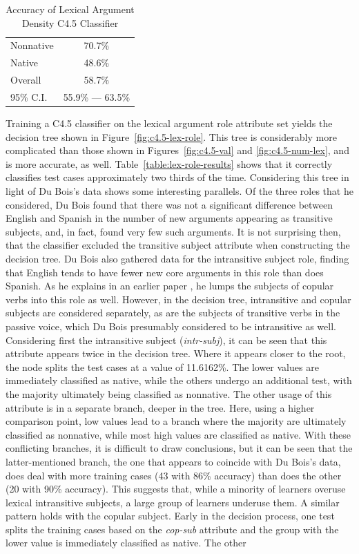 \documentclass[main.tex]{subfiles}
\begin{document}
\begin{table}[ht]
\centering
\caption{Accuracy of Lexical Argument Density C4.5 Classifier}
\begin{tabular}{l c}
\toprule
Nonnative & 70.7\% \\
Native & 48.6\% \\
Overall & 58.7\% \\
95\% C.I. & 55.9\% --- 63.5\%\\
\bottomrule
\end{tabular}
\label{table:num-lex-results}
\end{table}

Training a C4.5 classifier on the lexical argument role attribute set yields the decision tree shown in Figure~\ref{fig:c4.5-lex-role}. This tree is considerably more complicated than those shown in Figures~\ref{fig:c4.5-val} and \ref{fig:c4.5-num-lex}, and is more accurate, as well. Table~\ref{table:lex-role-results} shows that it correctly classifies test cases approximately two thirds of the time. Considering this tree in light of Du Bois's data shows some interesting parallels. Of the three roles that he considered, Du Bois found that there was not a significant difference between English and Spanish in the number of new arguments appearing as transitive subjects, and, in fact, found very few such arguments. It is not surprising then, that the classifier excluded the transitive subject attribute when constructing the decision tree. Du Bois also gathered data for the intransitive subject role, finding that English tends to have fewer new core arguments in this role than does Spanish. As he explains in an earlier paper \citep{dubois:1987}, he lumps the subjects of copular verbs into this role as well. However, in the decision tree, intransitive and copular subjects are considered separately, as are the subjects of transitive verbs in the passive voice, which Du Bois presumably considered to be intransitive as well. Considering first the intransitive subject (\textit{intr-subj}), it can be seen that this attribute appears twice in the decision tree. Where it appears closer to the root, the node splits the test cases at a value of 11.6162\%. The lower values are immediately classified as native, while the others undergo an additional test, with the majority ultimately being classified as nonnative. The other usage of this attribute is in a separate branch, deeper in the tree. Here, using a higher comparison point, low values lead to a branch where the majority are ultimately classified as nonnative, while most high values are classified as native. With these conflicting branches, it is difficult to draw conclusions, but it can be seen that the latter-mentioned branch, the one that appears to coincide with Du Bois's data, does deal with more training cases (43 with 86\% accuracy) than does the other (20 with 90\% accuracy). This suggests that, while a minority of learners overuse lexical intransitive subjects, a large group of learners underuse them. A similar pattern holds with the copular subject. Early in the decision process, one test splits the training cases based on the \textit{cop-sub} attribute and the group with the lower value is immediately classified as native. The other 
\end{document}
